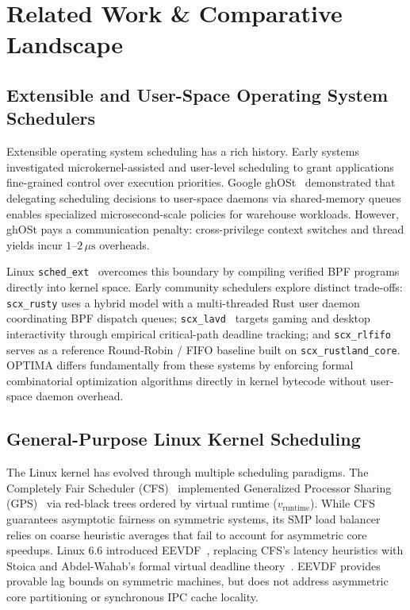 \documentclass[conference]{IEEEtran}
\begin{document}
\section{Related Work \& Comparative Landscape}
\label{sec:related_work}

\subsection{Extensible and User-Space Operating System Schedulers}
Extensible operating system scheduling has a rich history. Early systems investigated microkernel-assisted and user-level scheduling to grant applications fine-grained control over execution priorities. Google ghOSt~\cite{humphries2021ghost} demonstrated that delegating scheduling decisions to user-space daemons via shared-memory queues enables specialized microsecond-scale policies for warehouse workloads. However, ghOSt pays a communication penalty: cross-privilege context switches and thread yields incur $1\text{--}2\,\mu\text{s}$ overheads. 

Linux \texttt{sched\_ext}~\cite{heo2024schedext,hodges2024schedextscale} overcomes this boundary by compiling verified BPF programs directly into kernel space. Early community schedulers explore distinct trade-offs: \texttt{scx\_rusty} uses a hybrid model with a multi-threaded Rust user daemon coordinating BPF dispatch queues; \texttt{scx\_lavd}~\cite{min2024scxlavd} targets gaming and desktop interactivity through empirical critical-path deadline tracking; and \texttt{scx\_rlfifo}~\cite{scx_repo} serves as a reference Round-Robin / FIFO baseline built on \texttt{scx\_rustland\_core}. OPTIMA differs fundamentally from these systems by enforcing formal combinatorial optimization algorithms directly in kernel bytecode without user-space daemon overhead.

\subsection{General-Purpose Linux Kernel Scheduling}
The Linux kernel has evolved through multiple scheduling paradigms. The Completely Fair Scheduler (CFS)~\cite{molnar2007cfs} implemented Generalized Processor Sharing (GPS)~\cite{parekh1993gps} via red-black trees ordered by virtual runtime ($v_{\text{runtime}}$). While CFS guarantees asymptotic fairness on symmetric systems, its SMP load balancer relies on coarse heuristic averages that fail to account for asymmetric core speedups. Linux 6.6 introduced EEVDF~\cite{zijlstra2023eevdf}, replacing CFS's latency heuristics with Stoica and Abdel-Wahab's formal virtual deadline theory~\cite{stoica1995eevdf,stoica1996proportional}. EEVDF provides provable lag bounds on symmetric machines, but does not address asymmetric core partitioning or synchronous IPC cache locality. 
\end{document}
